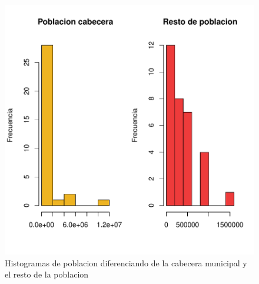 \documentclass{article}
\begin{document}
\begin{figure}
\centering
\begin{adjustbox}{width=7cm,height=7cm,clip,trim=1.5cm 0.5cm 0cm 1.5cm}
\includegraphics{Proyecto-004}
\end{adjustbox}
\caption{Histogramas de poblacion diferenciando de la cabecera municipal y el resto de la poblacion}
\label{histogramaPobla}
\end{figure}
\end{document}
